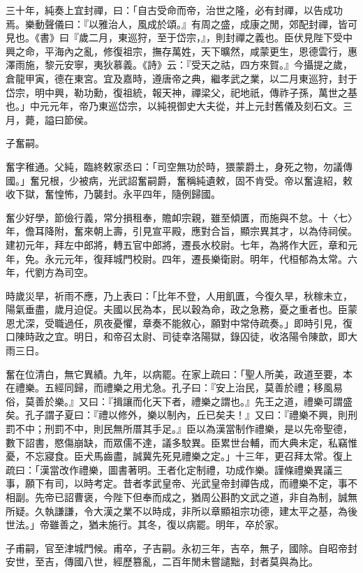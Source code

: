 \begin{pinyinscope}
三十年，純奏上宜封禪，曰：「自古受命而帝，治世之隆，必有封禪，以告成功焉。樂動聲儀曰：『以雅治人，風成於頌。』有周之盛，成康之閒，郊配封禪，皆可見也。《書》曰『歲二月，東巡狩，至于岱宗，』，則封禪之義也。臣伏見陛下受中興之命，平海內之亂，修復祖宗，撫存萬姓，天下曠然，咸蒙更生，恩德雲行，惠澤雨施，黎元安寧，夷狄慕義。《詩》云：『受天之祜，四方來賀。』今攝提之歲，倉龍甲寅，德在東宮。宜及嘉時，遵唐帝之典，繼孝武之業，以二月東巡狩，封于岱宗，明中興，勒功勳，復祖統，報天神，禪梁父，祀地祇，傳祚子孫，萬世之基也。」中元元年，帝乃東巡岱宗，以純視御史大夫從，并上元封舊儀及刻石文。三月，薨，謚曰節侯。

子奮嗣。

奮字稚通。父純，臨終敕家丞曰：「司空無功於時，猥蒙爵土，身死之物，勿議傳國。」奮兄根，少被病，光武詔奮嗣爵，奮稱純遺敕，固不肯受。帝以奮違紹，敕收下獄，奮惶怖，乃襲封。永平四年，隨例歸國。

奮少好學，節儉行義，常分損租奉，贍卹宗親，雖至傾匱，而施與不怠。十〈七〉年，儋耳降附，奮來朝上壽，引見宣平殿，應對合旨，顯宗異其才，以為侍祠侯。建初元年，拜左中郎將，轉五官中郎將，遷長水校尉。七年，為將作大匠，章和元年，免。永元元年，復拜城門校尉。四年，遷長樂衛尉。明年，代桓郁為太常。六年，代劉方為司空。

時歲災旱，祈雨不應，乃上表曰：「比年不登，人用飢匱，今復久旱，秋稼未立，陽氣垂盡，歲月迫促。夫國以民為本，民以穀為命，政之急務，憂之重者也。臣蒙恩尤深，受職過任，夙夜憂懼，章奏不能敘心，願對中常侍疏奏。」即時引見，復口陳時政之宜。明日，和帝召太尉、司徒幸洛陽獄，錄囚徒，收洛陽令陳歆，即大雨三日。

奮在位清白，無它異績。九年，以病罷。在家上疏曰：「聖人所美，政道至要，本在禮樂。五經同歸，而禮樂之用尤急。孔子曰：『安上治民，莫善於禮；移風易俗，莫善於樂。』又曰：『揖讓而化天下者，禮樂之謂也。』先王之道，禮樂可謂盛矣。孔子謂子夏曰：『禮以修外，樂以制內，丘已矣夫！』又曰：『禮樂不興，則刑罰不中；刑罰不中，則民無所厝其手足。』臣以為漢當制作禮樂，是以先帝聖德，數下詔書，愍傷崩缺，而眾儒不達，議多駮異。臣累世台輔，而大典未定，私竊惟憂，不忘寢食。臣犬馬齒盡，誠冀先死見禮樂之定。」十三年，更召拜太常。復上疏曰：「漢當改作禮樂，圖書著明。王者化定制禮，功成作樂。謹條禮樂異議三事，願下有司，以時考定。昔者孝武皇帝、光武皇帝封禪告成，而禮樂不定，事不相副。先帝已詔曹褒，今陛下但奉而成之，猶周公斟酌文武之道，非自為制，誠無所疑。久執謙謙，令大漢之業不以時成，非所以章顯祖宗功德，建太平之基，為後世法。」帝雖善之，猶未施行。其冬，復以病罷。明年，卒於家。

子甫嗣，官至津城門候。甫卒，子吉嗣。永初三年，吉卒，無子，國除。自昭帝封安世，至吉，傳國八世，經歷篡亂，二百年閒未嘗譴黜，封者莫與為比。


\end{pinyinscope}
